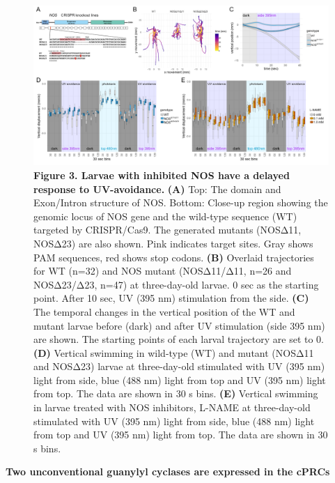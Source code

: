 \documentclass[
  10pt,
  onecolumn]{article}
\begin{document}
\begin{figure}
\centering
\includegraphics[width=1\textwidth,height=\textheight]{../figures/Fig3.png}
\caption{\textbf{Figure 3. Larvae with inhibited NOS have a delayed
response to UV-avoidance.} \textbf{(A)} Top: The domain and Exon/Intron
structure of NOS. Bottom: Close-up region showing the genomic locus of
NOS gene and the wild-type sequence (WT) targeted by CRISPR/Cas9. The
generated mutants (NOSΔ11, NOSΔ23) are also shown. Pink indicates target
sites. Gray shows PAM sequences, red shows stop codons. \textbf{(B)}
Overlaid trajectories for WT (n=32) and NOS mutant (NOSΔ11/Δ11, n=26 and
NOSΔ23/Δ23, n=47) at three-day-old larvae. 0 sec as the starting point.
After 10 sec, UV (395 nm) stimulation from the side. \textbf{(C)} The
temporal changes in the vertical position of the WT and mutant larvae
before (dark) and after UV stimulation (side 395 nm) are shown. The
starting points of each larval trajectory are set to 0. \textbf{(D)}
Vertical swimming in wild-type (WT) and mutant (NOSΔ11 and NOSΔ23)
larvae at three-day-old stimulated with UV (395 nm) light from side,
blue (488 nm) light from top and UV (395 nm) light from top. The data
are shown in 30 s bins. \textbf{(E)} Vertical swimming in larvae treated
with NOS inhibitors, L-NAME at three-day-old stimulated with UV (395 nm)
light from side, blue (488 nm) light from top and UV (395 nm) light from
top. The data are shown in 30 s bins.}
\end{figure}

\textbf{Two unconventional guanylyl cyclases are expressed in the cPRCs}
\end{document}
